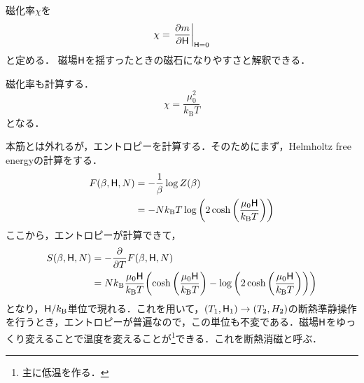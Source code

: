 	\begin{defn}[$\mf=0$での磁化率]
			磁化率$\chi$を
			\begin{equation}
					\chi = \left.\pdv{m}{\mathsf{H}}\right|_{\mathsf{H}=0}
			\end{equation}
			と定める．
			磁場$\mathsf{H}$を揺すったときの磁石になりやすさと解釈できる．
	\end{defn}

	磁化率も計算する．
	\begin{equation}
			\chi = \frac{\mu_{0}^{2}}{k_{\text{B}}T}\label{eq:single_suscep}
	\end{equation}
	となる．

	本筋とは外れるが，エントロピーを計算する．そのためにまず，Helmholtz free energyの計算をする．
	\begin{align}
			F(\beta, \mathsf{H}, N)&= -\frac{1}{\beta}\log Z(\beta)\\
							&= -Nk_{\text{B}}T\log\qty(2\cosh\qty(\frac{\mu_0\mathsf{H}}{k_{\text{B}}T}))
	\end{align}
	ここから，エントロピーが計算できて，
	\begin{align}
			S(\beta, \mathsf{H}, N) &= -\pdv{}{T}F(\beta, \mathsf{H}, N)\\
							 &= Nk_{\text{B}}\frac{\mu_0\mathsf{H}}{k_{\text{B}}T}\qty(\cosh\qty(\frac{\mu_0\mathsf{H}}{k_{\text{B}}T}) - \log \qty(2\cosh\qty(\frac{\mu_0\mathsf{H}}{k_{\text{B}}T})))
	\end{align}
	となり，$\mathsf{H}/k_{\text{B}}$単位で現れる．これを用いて，$(T_1, \mathsf{H}_1)\rightarrow(T_2, H_2)$の断熱準静操作を行うとき，エントロピーが普遍なので，この単位も不変である．磁場$\mathsf{H}$をゆっくり変えることで温度を変えることが\footnote{主に低温を作る．}できる．これを断熱消磁と呼ぶ．

